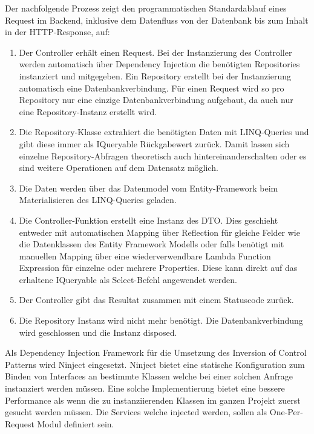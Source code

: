 \label{ablauf-request}
Der nachfolgende Prozess zeigt den programmatischen Standardablauf eines Request im Backend, inklusive dem Datenfluss
von der Datenbank bis zum Inhalt in der HTTP-Response, auf:

\begin{enumerate}
  \item
    Der Controller erh\"alt einen Request. Bei der Instanzierung des Controller werden automatisch \"uber Dependency Injection
    die ben\"otigten Repositories instanziert und mitgegeben. Ein Repository erstellt bei der Instanzierung automatisch
    eine Datenbankverbindung. F\"ur einen Request wird so pro Repository nur eine einzige Datenbankverbindung aufgebaut, da
    auch nur eine Repository-Instanz erstellt wird.
  \item
    Die Repository-Klasse extrahiert die ben\"otigten Daten mit LINQ-Queries und gibt diese immer als IQueryable
    R\"uckgabewert zur\"uck. Damit lassen sich einzelne Repository-Abfragen theoretisch auch hintereinanderschalten oder es
    sind weitere Operationen auf dem Datensatz m\"oglich.
  \item
    Die Daten werden \"uber das Datenmodel vom Entity-Framework beim Materialisieren des LINQ-Queries geladen.
  \item
    Die Controller-Funktion erstellt eine Instanz des DTO. Dies geschieht entweder mit automatischen Mapping \"uber
    Reflection f\"ur gleiche Felder wie die Datenklassen des Entity Framework Modells oder falls ben\"otigt mit manuellen
    Mapping \"uber eine wiederverwendbare Lambda Function Expression f\"ur einzelne oder mehrere Properties. Diese kann
    direkt auf das erhaltene IQueryable als Select-Befehl angewendet werden.
  \item
    Der Controller gibt das Resultat zusammen mit einem Statuscode zur\"uck.
  \item
    Die Repository Instanz wird nicht mehr ben\"otigt. Die Datenbankverbindung wird geschlossen und die Instanz disposed.
\end{enumerate}

\newpage
{}\label{dependency-injection}
Als Dependency Injection Framework f\"ur die Umsetzung des Inversion of Control Patterns wird Ninject eingesetzt.
Ninject bietet eine statische Konfiguration zum Binden von Interfaces an bestimmte Klassen welche bei einer solchen
Anfrage instanziert werden m\"ussen. Eine solche Implementierung bietet eine bessere Performance als wenn die zu
instanziierenden Klassen im ganzen Projekt zuerst gesucht werden m\"ussen. Die Services welche injected werden, sollen
als One-Per-Request Modul definiert sein.


